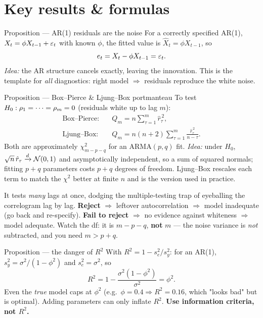 \documentclass[11pt]{article}
\begin{document}
\section*{Key results \& formulas}

\begin{result}{Proposition --- AR(1) residuals are the noise}
For a correctly specified AR(1), $X_t=\phi X_{t-1}+\varepsilon_t$ with known $\phi$, the fitted value is $\hat X_t=\phi X_{t-1}$, so
\[
e_t = X_t-\phi X_{t-1}=\varepsilon_t.
\]
\emph{Idea:} the AR structure cancels exactly, leaving the innovation. This is the template for \emph{all} diagnostics: right model $\Rightarrow$ residuals reproduce the white noise.
\end{result}

\begin{result}{Proposition --- Box--Pierce \& Ljung--Box portmanteau}
To test $H_0:\rho_1=\cdots=\rho_m=0$ (residuals white up to lag $m$):
\[
\begin{aligned}
\text{Box--Pierce:}\quad & Q_m = n\sum_{\tau=1}^{m}\hat r_\tau^{\,2},\\
\text{Ljung--Box:}\quad  & Q_m = n(n+2)\sum_{\tau=1}^{m}\frac{\hat r_\tau^{\,2}}{n-\tau}.
\end{aligned}
\]
Both are approximately $\chi^2_{m-p-q}$ for an ARMA$(p,q)$ fit. \emph{Idea:} under $H_0$, $\sqrt n\,\hat r_\tau\xrightarrow{d}\mathcal N(0,1)$ and asymptotically independent, so a sum of squared normals; fitting $p+q$ parameters costs $p+q$ degrees of freedom. Ljung--Box rescales each term to match the $\chi^2$ better at finite $n$ and is the version used in practice.
\end{result}

\begin{intu}
It tests \emph{many} lags at once, dodging the multiple-testing trap of eyeballing the correlogram lag by lag. \textbf{Reject} $\Rightarrow$ leftover autocorrelation $\Rightarrow$ model inadequate (go back and re-specify). \textbf{Fail to reject} $\Rightarrow$ no evidence against whiteness $\Rightarrow$ model adequate. Watch the df: it is $m-p-q$, \textbf{not} $m$ --- the noise variance is \emph{not} subtracted, and you need $m>p+q$.
\end{intu}

\begin{result}{Proposition --- the danger of $R^2$}
With $R^2=1-s_e^2/s_y^2$: for an AR(1), $s_y^2=\sigma^2/(1-\phi^2)$ and $s_e^2=\sigma^2$, so
\[
R^2 = 1-\frac{\sigma^2(1-\phi^2)}{\sigma^2}=\phi^2.
\]
Even the \emph{true} model caps at $\phi^2$ (e.g.\ $\phi=0.4\Rightarrow R^2=0.16$, which "looks bad" but is optimal). Adding parameters can only inflate $R^2$. \textbf{Use information criteria, not $R^2$.}
\end{result}
\end{document}
